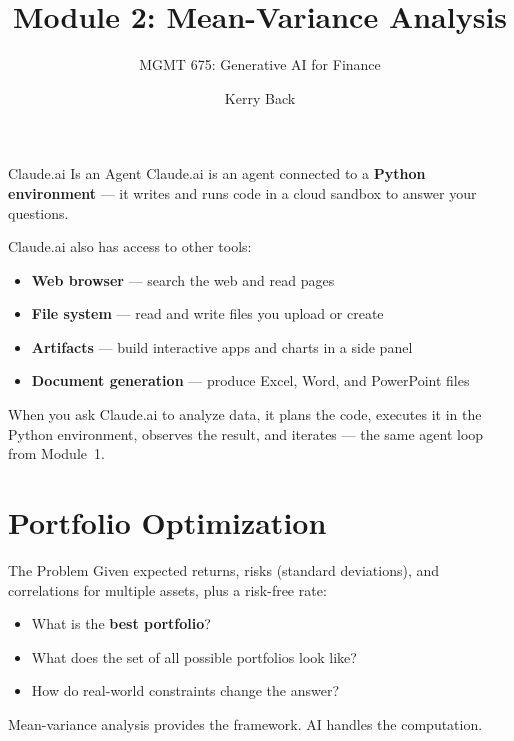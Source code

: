 \documentclass[aspectratio=169]{beamer}
\subtitle{MGMT 675: Generative AI for Finance}
\title{Module 2: Mean-Variance Analysis}
\author{Kerry Back}
\date{}
\begin{document}
\maketitle

\begin{frame}{Claude.ai Is an Agent}
Claude.ai is an agent connected to a \textbf{Python environment} --- it writes and runs code in a cloud sandbox to answer your questions.
\vspace{0.3cm}

Claude.ai also has access to other tools:
\begin{itemize}
  \item \textbf{Web browser} --- search the web and read pages
  \item \textbf{File system} --- read and write files you upload or create
  \item \textbf{Artifacts} --- build interactive apps and charts in a side panel
  \item \textbf{Document generation} --- produce Excel, Word, and PowerPoint files
\end{itemize}
\vspace{0.3cm}
When you ask Claude.ai to analyze data, it plans the code, executes it in the Python environment, observes the result, and iterates --- the same agent loop from Module~1.
\end{frame}

\section{Portfolio Optimization}

\begin{frame}{The Problem}
Given expected returns, risks (standard deviations), and correlations for multiple assets, plus a risk-free rate:

\begin{itemize}
  \item What is the \textbf{best portfolio}?
  \item What does the set of all possible portfolios look like?
  \item How do real-world constraints change the answer?
\end{itemize}

\vspace{0.3cm}
Mean-variance analysis provides the framework.  AI handles the computation.
\end{frame}
\end{document}
